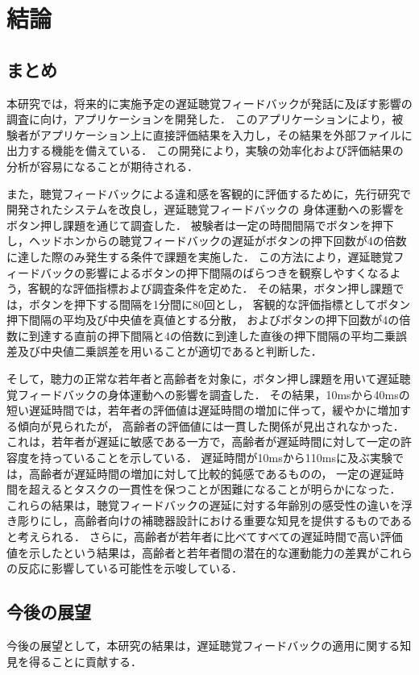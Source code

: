 \chapter{結論}
\section{まとめ}
本研究では，将来的に実施予定の遅延聴覚フィードバックが発話に及ぼす影響の調査に向け，アプリケーションを開発した．
このアプリケーションにより，被験者がアプリケーション上に直接評価結果を入力し，その結果を外部ファイルに出力する機能を備えている．
この開発により，実験の効率化および評価結果の分析が容易になることが期待される．

また，聴覚フィードバックによる違和感を客観的に評価するために，先行研究で開発されたシステムを改良し，遅延聴覚フィードバックの
身体運動への影響をボタン押し課題を通じて調査した．
被験者は一定の時間間隔でボタンを押下し，ヘッドホンからの聴覚フィードバックの遅延がボタンの押下回数が4の倍数に達した際のみ発生する条件で課題を実施した．
この方法により，遅延聴覚フィードバックの影響によるボタンの押下間隔のばらつきを観察しやすくなるよう，客観的な評価指標および調査条件を定めた．
その結果，ボタン押し課題では，ボタンを押下する間隔を1分間に80回とし，
客観的な評価指標としてボタン押下間隔の平均及び中央値を真値とする分散，
およびボタンの押下回数が4の倍数に到達する直前の押下間隔と4の倍数に到達した直後の押下間隔の平均二乗誤差及び中央値二乗誤差を用いることが適切であると判断した．

そして，聴力の正常な若年者と高齢者を対象に，ボタン押し課題を用いて遅延聴覚フィードバックの身体運動への影響を調査した．
その結果，10msから40msの短い遅延時間では，若年者の評価値は遅延時間の増加に伴って，緩やかに増加する傾向が見られたが，
高齢者の評価値には一貫した関係が見出されなかった．
これは，若年者が遅延に敏感である一方で，高齢者が遅延時間に対して一定の許容度を持っていることを示している．
遅延時間が10msから110msに及ぶ実験では，高齢者が遅延時間の増加に対して比較的鈍感であるものの，
一定の遅延時間を超えるとタスクの一貫性を保つことが困難になることが明らかになった．
これらの結果は，聴覚フィードバックの遅延に対する年齢別の感受性の違いを浮き彫りにし，高齢者向けの補聴器設計における重要な知見を提供するものであると考えられる．
さらに，高齢者が若年者に比べてすべての遅延時間で高い評価値を示したという結果は，高齢者と若年者間の潜在的な運動能力の差異がこれらの反応に影響している可能性を示唆している．
\section{今後の展望}
今後の展望として，本研究の結果は，遅延聴覚フィードバックの適用に関する知見を得ることに貢献する．
